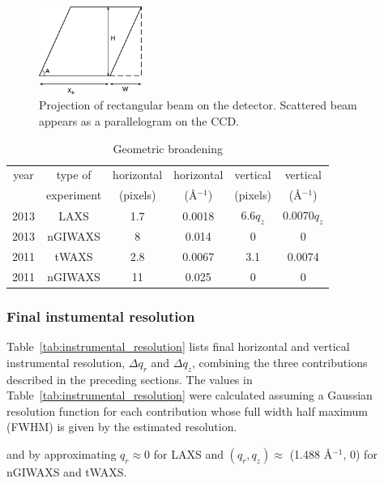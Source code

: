 \begin{figure}[htbp]
  \centering
  \includegraphics[width=0.3\textwidth]{figures/ripple/MMs/transmission/geometric_broadening4}
  \caption{Projection of rectangular beam on the detector. Scattered beam
  appears as a parallelogram on the CCD.}
  \label{fig:gb_trans3}
\end{figure}

\begin{table}[p]
  \centering
  \begin{tabular}{cccccc}
    \hline
    year & type of & horizontal & horizontal & vertical & vertical \\
     & experiment & (pixels) & (\AA$^{-1}$) & (pixels) & (\AA$^{-1}$) \\
    \hline
    2013 & LAXS & 1.7 & 0.0018 & 6.6$q_z$ & 0.0070$q_z$ \\
    2013 & nGIWAXS & 8 & 0.014 & 0 & 0 \\
    2011 & tWAXS & 2.8 & 0.0067 & 3.1 & 0.0074 \\
    2011 & nGIWAXS & 11 & 0.025 & 0 & 0 \\
    \hline
  \end{tabular}
  \caption{Geometric broadening}
  \label{tab:geometric_broadening}
\end{table}

\newpage
\subsubsection{Final instumental resolution}\label{sec:resolution_formula}
Table~\ref{tab:instrumental_resolution} lists final 
horizontal and vertical instrumental resolution, $\Delta q_r$ and $\Delta q_z$,
combining the three contributions described in the preceding sections.
The values in Table~\ref{tab:instrumental_resolution} were calculated
assuming a Gaussian resolution function for each contribution
whose full width half maximum (\gls{FWHM}) is given by the estimated resolution.

and by approximating $q_r \approx 0$ for LAXS and 
$(q_r, q_z)\approx$ (1.488 \AA$^{-1}$, 0) for nGIWAXS and tWAXS.


